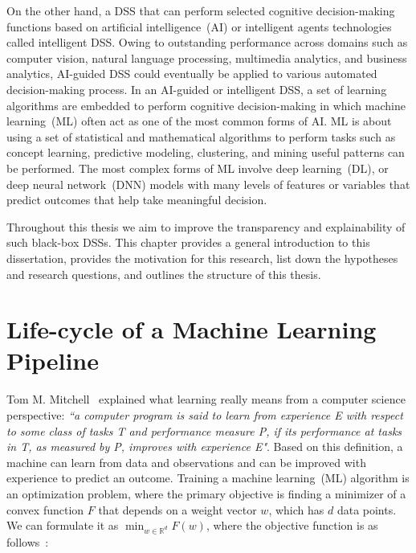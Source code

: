 \hspace*{3.5mm} On the other hand, a DSS that can perform selected cognitive decision-making functions based on artificial intelligence~(AI) or intelligent agents technologies called intelligent DSS. Owing to outstanding performance across domains such as computer vision, natural language processing, multimedia analytics, and business analytics, AI-guided DSS could eventually be applied to various automated decision-making process. In an AI-guided or intelligent DSS, a set of learning algorithms are embedded to perform cognitive decision-making in which machine learning~(ML) often act as one of the most common forms of AI. ML is about using a set of statistical and mathematical algorithms to perform tasks such as concept learning, predictive modeling, clustering, and mining useful patterns can be performed. The most complex forms of ML involve deep learning~(DL), or deep neural network~(DNN) models with many levels of features or variables that predict outcomes that help take meaningful decision. 


\hspace*{3.5mm} Throughout this thesis we aim to improve the transparency and explainability of such black-box DSSs. This chapter provides a general introduction to this dissertation, provides the motivation for this research, list down the hypotheses and research questions, and outlines the structure of this thesis. 

\section{Life-cycle of a Machine Learning Pipeline}
Tom M. Mitchell~\cite{mitchell1997machine} explained what learning really means from a computer science perspective: \textit{``a computer program is said to learn from experience E with respect to some class of tasks T and performance measure P, if its performance at tasks in T, as measured by P, improves with experience E"}. Based on this definition, a machine can learn from data and observations and can be improved with experience to predict an outcome. Training a machine learning~(ML) algorithm is an optimization problem, where the primary objective is finding a minimizer of a convex function $F$ that depends on a weight vector $w$, which has $d$ data points. We can formulate it as $\min _{w \in \mathbb{R}^{d}} F(w)$, where the objective function is as follows~\cite{karim2018scala}:

